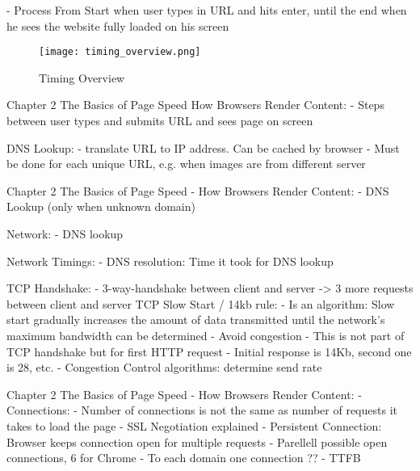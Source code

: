 - Process From Start when user types in URL and hits enter, until the end when he sees the website fully loaded on his screen


\begin{figure}[h!]
\begin{center}
\texttt{[image: timing\_overview.png]}
\caption{Timing Overview}
\label{img:timing_overview}
\end{center}
\end{figure}


Chapter 2 The Basics of Page Speed
How Browsers Render Content:
- Steps between user types and submits URL and sees page on screen






DNS Lookup:
- translate URL to IP address. Can be cached by browser
- Must be done for each unique URL, e.g. when images are from different server

Chapter 2 The Basics of Page Speed - How Browsers Render Content:
- DNS Lookup (only when unknown domain)

Network:
- DNS lookup

Network Timings:
- DNS resolution: Time it took for DNS lookup






TCP Handshake:
- 3-way-handshake between client and server
-> 3 more requests between client and server
TCP Slow Start / 14kb rule:
- Is an algorithm: Slow start gradually increases the amount of data transmitted until the network's maximum bandwidth can be determined
- Avoid congestion
- This is not part of TCP handshake but for first HTTP request
- Initial response is 14Kb, second one is 28, etc.
- Congestion Control algorithms: determine send rate

Chapter 2 The Basics of Page Speed - How Browsers Render Content:
- Connections:
- Number of connections is not the same as number of requests it takes to load the page
- SSL Negotiation explained
- Persistent Connection: Browser keeps connection open for multiple requests
- Parellell possible open connections, 6 for Chrome
- To each domain one connection ??
- TTFB


